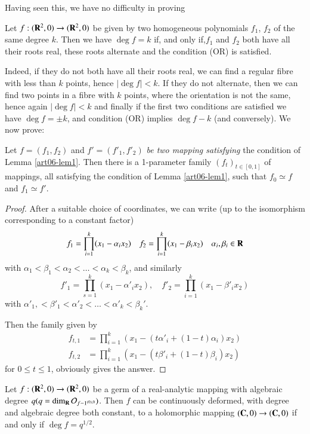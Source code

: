 Having seen this, we have no difficulty in proving 

\begin{lem}\label{art06-lem1}
Let $f: (\mathbf{R}^2, 0) \to (\mathbf{R}^2, 0)$ be given by two homogeneous polynomials $f_1$, $f_2$ of the same degree $k$. Then we have $\deg f = k $ if, and only if,\pageoriginale $f_1$ and $f_2$ both have all their roots real, these roots alternate and the condition (OR) is satisfied.
\end{lem}

Indeed, if they do not both have all their roots real, we can find a regular fibre with less than $k$ points, hence $|\deg f| < k$. If they do not alternate, then we can find two points in a fibre with $k$ points, where the orientation is not the same, hence again $|\deg f| < k$ and finally if the first two conditions are satisfied we have $\deg f = \pm k$, and condition (OR) implies $\deg f - k$ (and conversely). We now prove:

\begin{lem}\label{art06-lem2}
Let $f = (f_1, f_2)$ and $f' = (f'_1, f'_2)$ {\em  be two mapping satisfying}  the condition of Lemma \ref{art06-lem1}. Then there is a 1-parameter family $(f_t)_{t \in [0,1]}$ of mappings, all satisfying the condition of Lemma \ref{art06-lem1}, such that $f_0 \simeq f$ and $f_1 \simeq f'$.
\end{lem}
 
\begin{proof}
After a suitable choice of coordinates, we can write (up to the isomorphism corresponding to a constant factor)
$$
f_1 = \prod\limits^k_{i=1} (x_1 - \alpha_i x_2) \quad f_2 = \prod\limits^k_{i=1} (x_1 - \beta_i x_2) \quad \alpha_i, \beta_i \in \mathbf{R} 
$$
with $\alpha_1 < \beta_1 < \alpha_2 < \ldots < \alpha_k < \beta_k$, and similarly
$$
f'_1 = \prod\limits^k_{s =1} (x_1 - \alpha'_i x_2), \quad f'_2 =\prod\limits^k_{i=1} (x_1 -\beta'_i x_2)
$$
with $\alpha'_1, < \beta'_1 < \alpha'_2 < \ldots < \alpha'_k < \beta_k'$.

Then  the family given by
\begin{align*}
f_{t,1} & = \prod\limits^k_{i=1} (x_1 - (t\alpha'_i + (1-t)\alpha_i) x_2)\\
f_{t,2} & = \prod\limits^k_{i=1} (x_1 - (t\beta'_i + (1-t) \beta_i)x_2)
\end{align*}
for $0 \leqslant t \leqslant 1$, obviously gives the answer.
\end{proof}

\begin{theorem}\label{art06-thm2}
Let $f: (\mathbf{R}^2,0) \to (\mathbf{R}^2, 0)$ be a germ of a real-analytic mapping with algebraic degree $q(q = \dim_{\mathbf{R}} \mathcal{O}_{f-1^{(0),0}})$. Then $f$ can be continuously deformed, with degree and algebraic degree both constant, to a holomorphic mapping $(\mathbf{C},0) \to (\mathbf{C},0)$ if and only if $\deg f = q^{1/2}$.
\end{theorem}


